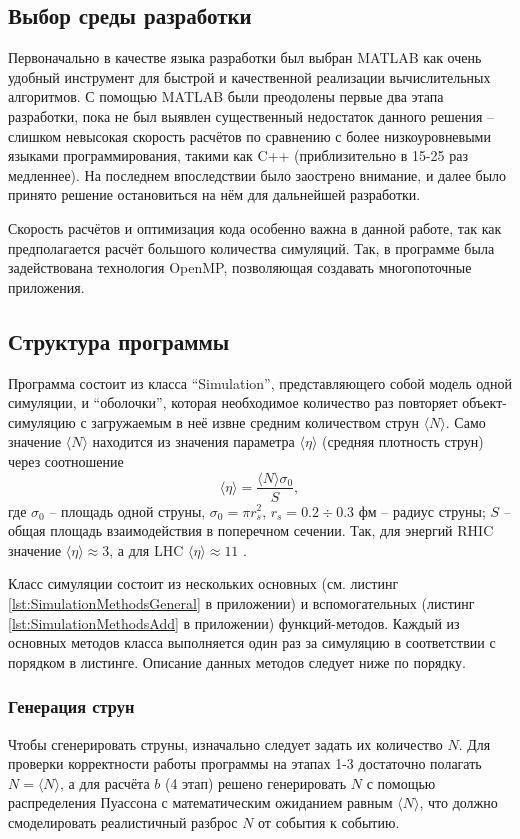 \subsection{Выбор среды разработки}
Первоначально в качестве языка разработки был выбран MATLAB как очень удобный инструмент для быстрой и качественной реализации вычислительных алгоритмов. С помощью MATLAB были преодолены первые два этапа разработки, пока не был выявлен существенный недостаток данного решения -- слишком невысокая скорость расчётов по сравнению с более низкоуровневыми языками программирования, такими как C++ (приблизительно в 15-25 раз медленнее). На последнем впоследствии было заострено внимание, и далее было принято решение остановиться на нём для дальнейшей разработки. 

Скорость расчётов и оптимизация кода особенно важна в данной работе, так как предполагается расчёт большого количества симуляций. Так, в программе была задействована технология OpenMP, позволяющая создавать многопоточные приложения. 
\subsection{Структура программы}
Программа состоит из класса ``Simulation'', представляющего собой модель одной симуляции, и ``оболочки'', которая необходимое количество раз повторяет объект-симуляцию с загружаемым в неё извне средним количеством струн $\langle N \rangle$. Само значение $\langle N \rangle$ находится из значения параметра $\langle \eta \rangle$ (средняя плотность струн) через соотношение 
\begin{equation} \label{eq:eta}
	\langle \eta \rangle = \frac{\langle N \rangle \sigma_0}{S},
\end{equation}
где $\sigma_0$ -- площадь одной струны, $\sigma_0 = \pi r_s^2$, $r_s = 0.2 \div 0.3$ фм -- радиус струны; $S$ -- общая площадь взаимодействия в поперечном сечении.
Так, для энергий RHIC значение $\langle \eta \rangle \approx 3$, а для LHC $\langle \eta \rangle \approx 11$ \cite{RHICandLHC}. 

Класс симуляции состоит из нескольких основных (см. листинг \ref{lst:SimulationMethodsGeneral} в приложении) и вспомогательных (листинг \ref{lst:SimulationMethodsAdd} в приложении) функций-методов. Каждый из основных методов класса выполняется один раз за симуляцию в соответствии с порядком в листинге. Описание данных методов следует ниже по порядку.
\subsubsection{Генерация струн}
Чтобы сгенерировать струны, изначально следует задать их количество $N$. 
Для проверки корректности работы программы на этапах 1-3 достаточно полагать $N = \langle N \rangle$, а для расчёта $b$ (4 этап) решено генерировать $N$ с помощью распределения Пуассона с математическим ожиданием равным $\langle N \rangle$, что должно смоделировать реалистичный разброс $N$ от события к событию. 

